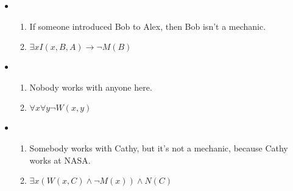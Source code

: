 \documentclass{article}
\begin{document}
\begin{enumerate}
\begin{itemize}
\begin{enumerate}
        \end{enumerate}
        \item
        \begin{enumerate}
            \item If someone introduced Bob to Alex, then Bob isn't a mechanic.
            \item $\exists x I(x, B, A) \rightarrow \neg M(B)$
        \end{enumerate}
        \item
        \begin{enumerate}
            \item Nobody works with anyone here.
            \item $\forall x \forall y \neg W(x, y)$
        \end{enumerate}
        \item
        \begin{enumerate}
            \item Somebody works with Cathy, but it's not a mechanic, because Cathy works at NASA.
            \item $\exists x (W(x, C) \wedge \neg M(x)) \wedge N(C)$
        \end{enumerate}



    \end{itemize}



\end{enumerate}
\end{document}
